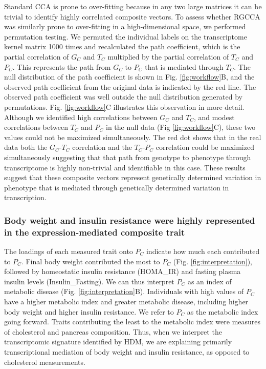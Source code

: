 \documentclass[
]{article}
\begin{document}
Standard CCA is prone to over-fitting because in any two large matrices
it can be trivial to identify highly correlated composite vectors. To
assess whether RGCCA was similarly prone to over-fitting in a
high-dimensional space, we performed permutation testing. We permuted
the individual labels on the transcriptome kernel matrix 1000 times and
recalculated the path coefficient, which is the partial correlation of
\(G_C\) and \(T_C\) multiplied by the partial correlation of \(T_C\) and
\(P_C\). This represents the path from \(G_C\) to \(P_C\) that is
mediated through \(T_C\). The null distribution of the path coefficient
is shown in Fig. \ref{fig:workflow}B, and the observed path coefficient
from the original data is indicated by the red line. The observed path
coefficient was well outside the null distribution generated by
permutations. Fig. \ref{fig:workflow}C illustrates this observation in
more detail. Although we identified high correlations between \(G_C\)
and \(T_C\), and modest correlations between \(T_C\) and \(P_C\) in the
null data (Fig \ref{fig:workflow}C), these two values could not be
maximized simultaneously. The red dot shows that in the real data both
the \(G_C\)-\(T_C\) correlation and the \(T_C\)-\(P_C\) correlation
could be maximized simultaneously suggesting that that path from
genotype to phenotype through transcriptome is highly non-trivial and
identifiable in this case. These results suggest that these composite
vectors represent genetically determined variation in phenotype that is
mediated through genetically determined variation in transcription.

\subsubsection{Body weight and insulin resistance were highly
represented in the expression-mediated composite
trait}\label{body-weight-and-insulin-resistance-were-highly-represented-in-the-expression-mediated-composite-trait}

The loadings of each measured trait onto \(P_C\) indicate how much each
contributed to \(P_C\). Final body weight contributed the most to
\(P_C\) (Fig. \ref{fig:interpretation}), followed by homeostatic insulin
resistance (HOMA\_IR) and fasting plasma insulin levels
(Insulin\_Fasting). We can thus interpret \(P_C\) as an index of
metabolic disease (Fig. \ref{fig:interpretation}B). Individuals with
high values of \(P_C\) have a higher metabolic index and greater
metabolic disease, including higher body weight and higher insulin
resistance. We refer to \(P_C\) as the metabolic index going forward.
Traits contributing the least to the metabolic index were measures of
cholesterol and pancreas composition. Thus, when we interpret the
transcriptomic signature identified by HDM, we are explaining primarily
transcriptional mediation of body weight and insulin resistance, as
opposed to cholesterol measurements.
\end{document}
